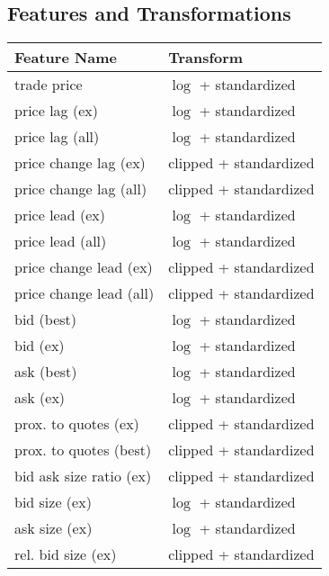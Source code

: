 \subsection{Features and Transformations}
\label{app:feature-and-transformations}

\begin{table}[H]
    \centering
    \begin{threeparttable}
        \begin{tabular}{@{}ll@{}}
            \toprule
            Feature Name            & Transform              \\ \midrule
            trade price             & $\log$ + standardized  \\
            price lag (ex)          & $\log$ + standardized  \\
            price lag (all)         & $\log$ + standardized  \\
            price change lag (ex)   & clipped + standardized \\
            price change lag (all)  & clipped + standardized \\
            price lead (ex)         & $\log$ + standardized  \\
            price lead (all)        & $\log$ + standardized  \\
            price change lead (ex)  & clipped + standardized \\
            price change lead (all) & clipped + standardized \\
            bid (best)              & $\log$ + standardized  \\
            bid (ex)                & $\log$ + standardized  \\
            ask (best)              & $\log$ + standardized  \\
            ask (ex)                & $\log$ + standardized  \\
            prox. to quotes (ex)    & clipped + standardized \\
            prox. to quotes (best)  & clipped + standardized \\ \addlinespace
            bid ask size ratio (ex) & clipped + standardized \\
            bid size (ex)           & $\log$ + standardized  \\
            ask size (ex)           & $\log$ + standardized  \\
            rel. bid size (ex)      & clipped + standardized \\

\end{tabular}
\end{threeparttable}
\end{table}
